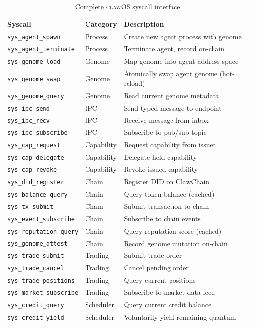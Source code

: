\documentclass{article}
\newcommand{\clawos}{\textsc{clawOS}}
\begin{document}
\begin{table}[h]
\caption{Complete \clawos{} syscall interface.}
\label{tab:syscalls}
\centering
\small
\begin{tabular}{llp{6cm}}
\toprule
\textbf{Syscall} & \textbf{Category} & \textbf{Description} \\
\midrule
\texttt{sys\_agent\_spawn} & Process & Create new agent process with genome \\
\texttt{sys\_agent\_terminate} & Process & Terminate agent, record on-chain \\
\texttt{sys\_genome\_load} & Genome & Map genome into agent address space \\
\texttt{sys\_genome\_swap} & Genome & Atomically swap agent genome (hot-reload) \\
\texttt{sys\_genome\_query} & Genome & Read current genome metadata \\
\texttt{sys\_ipc\_send} & IPC & Send typed message to endpoint \\
\texttt{sys\_ipc\_recv} & IPC & Receive message from inbox \\
\texttt{sys\_ipc\_subscribe} & IPC & Subscribe to pub/sub topic \\
\texttt{sys\_cap\_request} & Capability & Request capability from issuer \\
\texttt{sys\_cap\_delegate} & Capability & Delegate held capability \\
\texttt{sys\_cap\_revoke} & Capability & Revoke issued capability \\
\texttt{sys\_did\_register} & Chain & Register DID on ClawChain \\
\texttt{sys\_balance\_query} & Chain & Query token balance (cached) \\
\texttt{sys\_tx\_submit} & Chain & Submit transaction to chain \\
\texttt{sys\_event\_subscribe} & Chain & Subscribe to chain events \\
\texttt{sys\_reputation\_query} & Chain & Query reputation score (cached) \\
\texttt{sys\_genome\_attest} & Chain & Record genome mutation on-chain \\
\texttt{sys\_trade\_submit} & Trading & Submit trade order \\
\texttt{sys\_trade\_cancel} & Trading & Cancel pending order \\
\texttt{sys\_trade\_positions} & Trading & Query current positions \\
\texttt{sys\_market\_subscribe} & Trading & Subscribe to market data feed \\
\texttt{sys\_credit\_query} & Scheduler & Query current credit balance \\
\texttt{sys\_credit\_yield} & Scheduler & Voluntarily yield remaining quantum \\
\bottomrule
\end{tabular}
\end{table}
\end{document}
